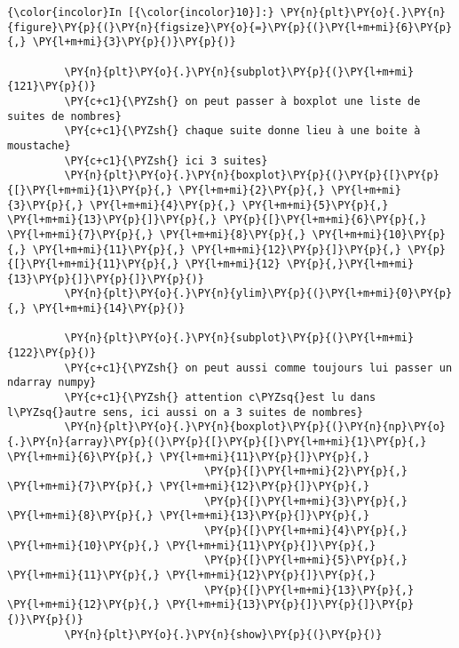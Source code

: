     \begin{Verbatim}[commandchars=\\\{\},frame=single,framerule=0.3mm,rulecolor=\color{cellframecolor}]
{\color{incolor}In [{\color{incolor}10}]:} \PY{n}{plt}\PY{o}{.}\PY{n}{figure}\PY{p}{(}\PY{n}{figsize}\PY{o}{=}\PY{p}{(}\PY{l+m+mi}{6}\PY{p}{,} \PY{l+m+mi}{3}\PY{p}{)}\PY{p}{)}
         
         \PY{n}{plt}\PY{o}{.}\PY{n}{subplot}\PY{p}{(}\PY{l+m+mi}{121}\PY{p}{)}
         \PY{c+c1}{\PYZsh{} on peut passer à boxplot une liste de suites de nombres}
         \PY{c+c1}{\PYZsh{} chaque suite donne lieu à une boite à moustache}
         \PY{c+c1}{\PYZsh{} ici 3 suites}
         \PY{n}{plt}\PY{o}{.}\PY{n}{boxplot}\PY{p}{(}\PY{p}{[}\PY{p}{[}\PY{l+m+mi}{1}\PY{p}{,} \PY{l+m+mi}{2}\PY{p}{,} \PY{l+m+mi}{3}\PY{p}{,} \PY{l+m+mi}{4}\PY{p}{,} \PY{l+m+mi}{5}\PY{p}{,} \PY{l+m+mi}{13}\PY{p}{]}\PY{p}{,} \PY{p}{[}\PY{l+m+mi}{6}\PY{p}{,} \PY{l+m+mi}{7}\PY{p}{,} \PY{l+m+mi}{8}\PY{p}{,} \PY{l+m+mi}{10}\PY{p}{,} \PY{l+m+mi}{11}\PY{p}{,} \PY{l+m+mi}{12}\PY{p}{]}\PY{p}{,} \PY{p}{[}\PY{l+m+mi}{11}\PY{p}{,} \PY{l+m+mi}{12} \PY{p}{,}\PY{l+m+mi}{13}\PY{p}{]}\PY{p}{]}\PY{p}{)}
         \PY{n}{plt}\PY{o}{.}\PY{n}{ylim}\PY{p}{(}\PY{l+m+mi}{0}\PY{p}{,} \PY{l+m+mi}{14}\PY{p}{)}
         
         \PY{n}{plt}\PY{o}{.}\PY{n}{subplot}\PY{p}{(}\PY{l+m+mi}{122}\PY{p}{)}
         \PY{c+c1}{\PYZsh{} on peut aussi comme toujours lui passer un ndarray numpy}
         \PY{c+c1}{\PYZsh{} attention c\PYZsq{}est lu dans l\PYZsq{}autre sens, ici aussi on a 3 suites de nombres}
         \PY{n}{plt}\PY{o}{.}\PY{n}{boxplot}\PY{p}{(}\PY{n}{np}\PY{o}{.}\PY{n}{array}\PY{p}{(}\PY{p}{[}\PY{p}{[}\PY{l+m+mi}{1}\PY{p}{,} \PY{l+m+mi}{6}\PY{p}{,} \PY{l+m+mi}{11}\PY{p}{]}\PY{p}{,}
                               \PY{p}{[}\PY{l+m+mi}{2}\PY{p}{,} \PY{l+m+mi}{7}\PY{p}{,} \PY{l+m+mi}{12}\PY{p}{]}\PY{p}{,}
                               \PY{p}{[}\PY{l+m+mi}{3}\PY{p}{,} \PY{l+m+mi}{8}\PY{p}{,} \PY{l+m+mi}{13}\PY{p}{]}\PY{p}{,}
                               \PY{p}{[}\PY{l+m+mi}{4}\PY{p}{,} \PY{l+m+mi}{10}\PY{p}{,} \PY{l+m+mi}{11}\PY{p}{]}\PY{p}{,}
                               \PY{p}{[}\PY{l+m+mi}{5}\PY{p}{,} \PY{l+m+mi}{11}\PY{p}{,} \PY{l+m+mi}{12}\PY{p}{]}\PY{p}{,}
                               \PY{p}{[}\PY{l+m+mi}{13}\PY{p}{,} \PY{l+m+mi}{12}\PY{p}{,} \PY{l+m+mi}{13}\PY{p}{]}\PY{p}{]}\PY{p}{)}\PY{p}{)}
         \PY{n}{plt}\PY{o}{.}\PY{n}{show}\PY{p}{(}\PY{p}{)}
\end{Verbatim}


    \begin{center}
    \end{center}
    { \hspace*{\fill} \\}
    

    
    
    
